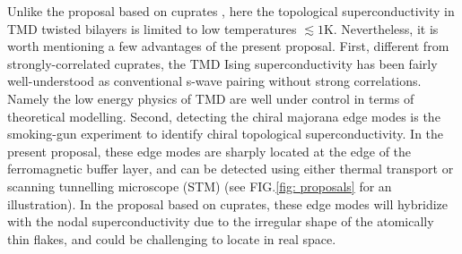 Unlike the proposal based on cuprates \cite{can2021high,song2021doping}, here the topological superconductivity in TMD twisted bilayers is limited to low temperatures $\lesssim 1$K. Nevertheless, it is worth mentioning a few advantages of the present proposal. First, different from strongly-correlated cuprates, the TMD Ising superconductivity has been fairly well-understood as conventional s-wave pairing without strong correlations. Namely the low energy physics of TMD are well under control in terms of theoretical modelling. Second, detecting the chiral majorana edge modes is the smoking-gun experiment to identify chiral topological superconductivity. In the present proposal, these edge modes are sharply located at the edge of the ferromagnetic buffer layer, and can be detected using either thermal transport or scanning tunnelling microscope (STM) (see FIG.\ref{fig: proposals} for an illustration). In the proposal based on cuprates, these edge modes will hybridize with the nodal superconductivity due to the irregular shape of the atomically thin flakes, and could be challenging to locate in real space.


